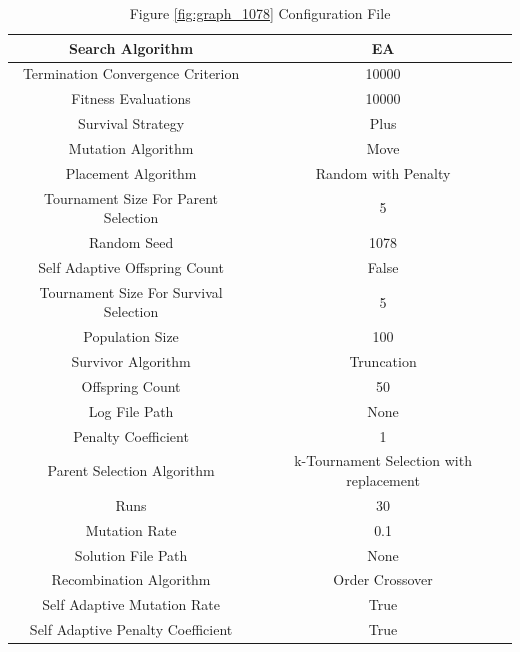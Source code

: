 \documentclass{standalone}
\begin{document}
\begin{table}[!htb]
	\centering
	\caption{Figure \ref{fig:graph_1078} Configuration File}
	\label{tab:graph_1078}
	\begin{tabular}{| c | c |}
		\hline
		Search Algorithm		& EA		 \\
		\hline
		Termination Convergence Criterion		& 10000		 \\
		\hline
		Fitness Evaluations		& 10000		 \\
		\hline
		Survival Strategy		& Plus		 \\
		\hline
		Mutation Algorithm		& Move		 \\
		\hline
		Placement Algorithm		& Random with Penalty		 \\
		\hline
		Tournament Size For Parent Selection		& 5		 \\
		\hline
		Random Seed		& 1078		 \\
		\hline
		Self Adaptive Offspring Count		& False		 \\
		\hline
		Tournament Size For Survival Selection		& 5		 \\
		\hline
		Population Size		& 100		 \\
		\hline
		Survivor Algorithm		& Truncation		 \\
		\hline
		Offspring Count		& 50		 \\
		\hline
		Log File Path		& None		 \\
		\hline
		Penalty Coefficient		& 1		 \\
		\hline
		Parent Selection Algorithm		& k-Tournament Selection with replacement		 \\
		\hline
		Runs		& 30		 \\
		\hline
		Mutation Rate		& 0.1		 \\
		\hline
		Solution File Path		& None		 \\
		\hline
		Recombination Algorithm		& Order Crossover		 \\
		\hline
		Self Adaptive Mutation Rate		& True		 \\
		\hline
		Self Adaptive Penalty Coefficient		& True		 \\
		\hline
	\end{tabular}
\end{table}
\end{document}
